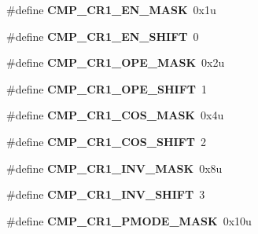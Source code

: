 \begin{DoxyCompactItemize}
\item 
\#define {\bfseries C\+M\+P\+\_\+\+C\+R1\+\_\+\+E\+N\+\_\+\+M\+A\+SK}~0x1u\hypertarget{group__CMP__Register__Masks_ga2492ad39a9661a1217cc26f20bd31ef2}{}\label{group__CMP__Register__Masks_ga2492ad39a9661a1217cc26f20bd31ef2}

\item 
\#define {\bfseries C\+M\+P\+\_\+\+C\+R1\+\_\+\+E\+N\+\_\+\+S\+H\+I\+FT}~0\hypertarget{group__CMP__Register__Masks_gacaacf0894bdf41eb49de1ae81075fa2b}{}\label{group__CMP__Register__Masks_gacaacf0894bdf41eb49de1ae81075fa2b}

\item 
\#define {\bfseries C\+M\+P\+\_\+\+C\+R1\+\_\+\+O\+P\+E\+\_\+\+M\+A\+SK}~0x2u\hypertarget{group__CMP__Register__Masks_gaaad42787753465406dd5006f228049dd}{}\label{group__CMP__Register__Masks_gaaad42787753465406dd5006f228049dd}

\item 
\#define {\bfseries C\+M\+P\+\_\+\+C\+R1\+\_\+\+O\+P\+E\+\_\+\+S\+H\+I\+FT}~1\hypertarget{group__CMP__Register__Masks_ga5c273c5f23e09e69a9589a285cbe2c24}{}\label{group__CMP__Register__Masks_ga5c273c5f23e09e69a9589a285cbe2c24}

\item 
\#define {\bfseries C\+M\+P\+\_\+\+C\+R1\+\_\+\+C\+O\+S\+\_\+\+M\+A\+SK}~0x4u\hypertarget{group__CMP__Register__Masks_gaf8b38740c4bddec386b2b7d674f5f0fc}{}\label{group__CMP__Register__Masks_gaf8b38740c4bddec386b2b7d674f5f0fc}

\item 
\#define {\bfseries C\+M\+P\+\_\+\+C\+R1\+\_\+\+C\+O\+S\+\_\+\+S\+H\+I\+FT}~2\hypertarget{group__CMP__Register__Masks_gaaf826df5b4ff2069e2cb112f03c7b782}{}\label{group__CMP__Register__Masks_gaaf826df5b4ff2069e2cb112f03c7b782}

\item 
\#define {\bfseries C\+M\+P\+\_\+\+C\+R1\+\_\+\+I\+N\+V\+\_\+\+M\+A\+SK}~0x8u\hypertarget{group__CMP__Register__Masks_ga562c151a4679c2b50e20d6418dcc7d99}{}\label{group__CMP__Register__Masks_ga562c151a4679c2b50e20d6418dcc7d99}

\item 
\#define {\bfseries C\+M\+P\+\_\+\+C\+R1\+\_\+\+I\+N\+V\+\_\+\+S\+H\+I\+FT}~3\hypertarget{group__CMP__Register__Masks_gae8bcf6f11eb6afb3967dc6e318b0c41f}{}\label{group__CMP__Register__Masks_gae8bcf6f11eb6afb3967dc6e318b0c41f}

\item 
\#define {\bfseries C\+M\+P\+\_\+\+C\+R1\+\_\+\+P\+M\+O\+D\+E\+\_\+\+M\+A\+SK}~0x10u\hypertarget{group__CMP__Register__Masks_ga09a2757123048a40e1694dd9454982ee}{}\label{group__CMP__Register__Masks_ga09a2757123048a40e1694dd9454982ee}


\end{DoxyCompactItemize}
